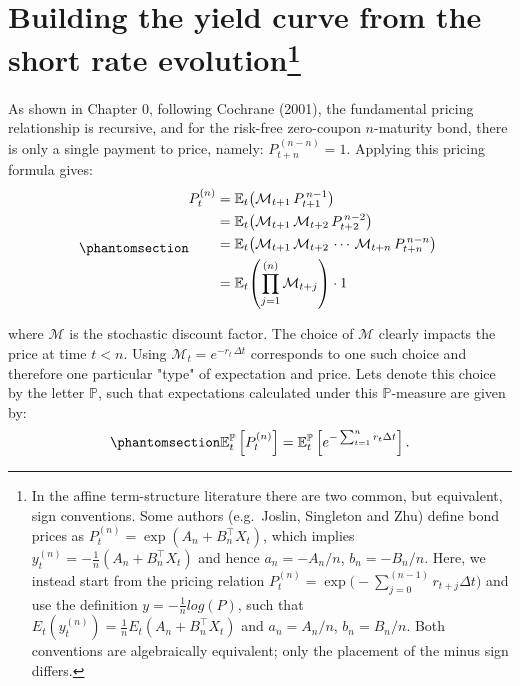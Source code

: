 \documentclass[
  letterpaper,
  DIV=11,
  numbers=noendperiod]{scrreprt}
\begin{document}
\section[Building the yield curve from the short rate
evolution]{\texorpdfstring{Building the yield curve from the short rate
evolution\footnote{In the affine term-structure literature there are two
  common, but equivalent, sign conventions. Some authors (e.g.~Joslin,
  Singleton and Zhu) define bond prices as
  \(P_t^{(n)} = \exp(A_n + B_n^\top X_t)\), which implies
  \(y_t^{(n)} = -\tfrac{1}{n}(A_n + B_n^\top X_t)\) and hence
  \(a_n = -A_n/n\), \(b_n = -B_n/n\). Here, we instead start from the
  pricing relation
  \(P_t^{(n)} = \exp\!\big(-\sum_{j=0}^{(n-1)} r_{t+j}\Delta t\big)\)
  and use the definition \(y=-\tfrac{1}{n}log(P)\), such that
  \(E_t(y_t^{(n)}) = \tfrac{1}{n}E_t(A_n + B_n^\top X_t)\) and
  \(a_n = A_n/n\), \(b_n = B_n/n\). Both conventions are algebraically
  equivalent; only the placement of the minus sign differs.}}{Building the yield curve from the short rate evolution}}\label{building-the-yield-curve-from-the-short-rate-evolution3}

As shown in Chapter 0, following Cochrane (2001), the fundamental
pricing relationship is recursive, and for the risk-free zero-coupon
\(n\)-maturity bond, there is only a single payment to price, namely:
\(P_{t+n}^{\, (n-n)}=1\). Applying this pricing formula gives:
\begin{equation}\protect\phantomsection\label{eq-fundamentalPrice}{
\begin{align}
    P_t^{(n)} &= \mathbb{E}_t\!\left( \mathcal{M}_{t+1} \, P_{t+1}^{\,n-1} \right) \nonumber \\
     &= \mathbb{E}_t\!\left( \mathcal{M}_{t+1} \, \mathcal{M}_{t+2} \, P_{t+2}^{\,n-2} \right) \nonumber \\
     &= \mathbb{E}_t\!\left( \mathcal{M}_{t+1} \, \mathcal{M}_{t+2}\, \cdots \, \mathcal{M}_{t+n} \, P_{t+n}^{\,n-n} \right) \ \\
     &= \mathbb{E}_t\!\left( \prod_{j=1}^{(n)} \mathcal{M}_{t+j} \right) \cdot 1
\end{align}
}\end{equation}

where \(\mathcal{M}\) is the stochastic discount factor. The choice of
\(\mathcal{M}\) clearly impacts the price at time \(t<n\). Using
\(\mathcal{M}_{t}=e^{-r_t\,\Delta t}\) corresponds to one such choice
and therefore one particular "type" of expectation and price. Lets
denote this choice by the letter \(\mathbb{P}\), such that expectations
calculated under this \(\mathbb{P}\)-measure are given by:
\begin{equation}\protect\phantomsection\label{eq-P-P}{
\begin{align}
         \mathbb{E}_t^{\mathbb{P}} \left[P_t^{(n)}\right] = \mathbb{E}^{\mathbb{P}}_t\left[ e^{-\sum^{n}_{t=1} r_t\Delta t} \right].
\end{align}
}\end{equation}
\end{document}
